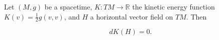 Let $(M, g)$ be a spacetime, $K: TM \to \mathbb{R}$ the kinetic energy function $K(v) = \frac{1}{2} g(v, v)$, and $H$ a horizontal vector field on $TM$. Then

$$dK(H) = 0.$$
